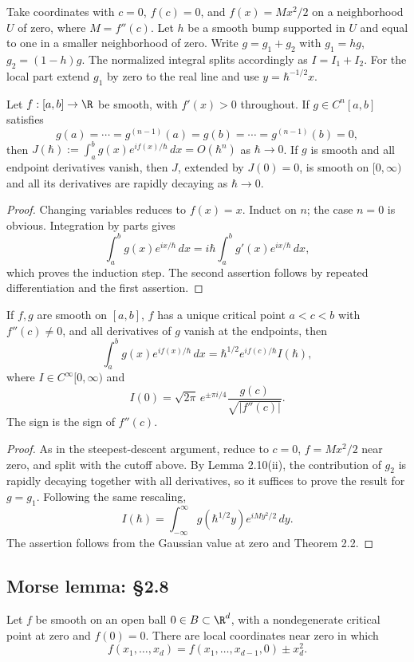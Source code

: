 Take coordinates with $c=0$, $f(c)=0$, and $f(x)=Mx^2/2$ on a neighborhood $U$ of zero, where $M=f''(c)$. Let $h$ be a smooth bump supported in $U$ and equal to one in a smaller neighborhood of zero. Write $g=g_1+g_2$ with $g_1=hg$, $g_2=(1-h)g$. The normalized integral splits accordingly as $I=I_1+I_2$. For the local part extend $g_1$ by zero to the real line and use $y=\hbar^{-1/2}x$.

\begin{lemma}
Let $f:[a,b]\to\R$ be smooth, with $f'(x)>0$ throughout. If $g\in C^n[a,b]$ satisfies
\[
g(a)=\cdots=g^{(n-1)}(a)=g(b)=\cdots=g^{(n-1)}(b)=0,
\]
then $J(\hbar):=\int_a^b g(x)e^{if(x)/\hbar}\,dx=O(\hbar^n)$ as $\hbar\to0$.
If $g$ is smooth and all endpoint derivatives vanish, then $J$, extended by $J(0)=0$, is smooth on $[0,\infty)$ and all its derivatives are rapidly decaying as $\hbar\to0$.
\end{lemma}
\begin{proof}
Changing variables reduces to $f(x)=x$. Induct on $n$; the case $n=0$ is obvious. Integration by parts gives
\[
\int_a^b g(x)e^{ix/\hbar}\,dx
=i\hbar\int_a^b g'(x)e^{ix/\hbar}\,dx,
\]
which proves the induction step. The second assertion follows by repeated differentiation and the first assertion.
\end{proof}

\begin{theorem}
If $f,g$ are smooth on $[a,b]$, $f$ has a unique critical point $a<c<b$ with $f''(c)\ne0$, and all derivatives of $g$ vanish at the endpoints, then
\[
\int_a^b g(x)e^{if(x)/\hbar}\,dx
=\hbar^{1/2}e^{if(c)/\hbar}I(\hbar),
\]
where $I\in C^\infty[0,\infty)$ and
\[
I(0)=\sqrt{2\pi}\,e^{\pm\pi i/4}\frac{g(c)}{\sqrt{|f''(c)|}}.
\]
The sign is the sign of $f''(c)$.
\end{theorem}
\begin{proof}
As in the steepest-descent argument, reduce to $c=0$, $f=Mx^2/2$ near zero, and split with the cutoff above. By Lemma 2.10(ii), the contribution of $g_2$ is rapidly decaying together with all derivatives, so it suffices to prove the result for $g=g_1$. Following the same rescaling,
\[
I(\hbar)=\int_{-\infty}^{\infty}g(\hbar^{1/2}y)e^{iMy^2/2}\,dy.
\]
The assertion follows from the Gaussian value at zero and Theorem 2.2.
\end{proof}

\subsection*{Morse lemma: §2.8}
\begin{theorem}
Let $f$ be smooth on an open ball $0\in B\subset\R^d$, with a nondegenerate critical point at zero and $f(0)=0$. There are local coordinates near zero in which
\[
f(x_1,\ldots,x_d)=f(x_1,\ldots,x_{d-1},0)\pm x_d^2.
\]
\end{theorem}
